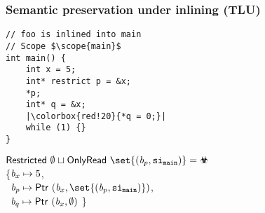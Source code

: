 \begin{frame}[fragile]
\frametitle{Semantic preservation under inlining (TLU)}
\begin{minipage}{.4\textwidth}
\begin{verbatim}
// foo is inlined into main
// Scope $\scope{main}$
int main() {
    int x = 5;
    int* restrict p = &x;
    *p;
    int* q = &x;
    |\colorbox{red!20}{*q = 0;}|
    while (1) {}
}
\end{verbatim}
\end{minipage}%
\begin{minipage}{.6\textwidth}
\colorbox{red!20}{$\restricted{\emptyset} \joinsym \onlyread{\set{(\Blockvar_p, \scope{main})}} = \rsub$} \\

\executionannotation
{
    \{$\textit{b}_x \mapsto 5$, \\
     \ $\Blockvar_p \mapsto \ptr{(\Blockvar_x, \set{(\Blockvar_p, \scope{main})})}$, \\
     \ $\textit{b}_q \mapsto \mathsf{Ptr} \ (\textit{b}_x, \emptyset)$
    \}
}
{
}
\end{minipage}

\end{frame}


